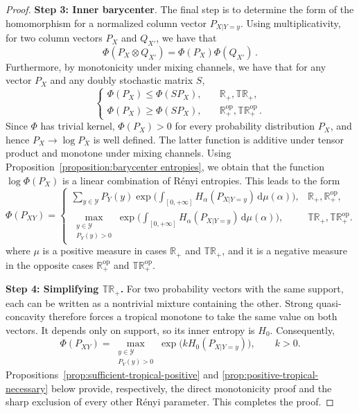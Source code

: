 \documentclass[aps,pra,11pt,onecolumn,nofootinbib,tightenlines]{revtex4-2}
\theoremstyle{definition}
\begin{document}
\begin{proof}
\noindent \textbf{Step 3: Inner barycenter}. The final step is to determine the form of the homomorphism for a normalized column vector $P_{X|Y=y}$. Using multiplicativity, for two column vectors $P_X$ and $Q_{X'}$, we have that
\begin{equation}
    \Phi(P_X \otimes Q_{X'}) = \Phi(P_X) \Phi(Q_{X'}) \,.
\end{equation}
Furthermore, by monotonicity under mixing channels, we have that for any vector $P_X$ and any doubly stochastic matrix $S$,
\begin{equation}
\begin{cases}
 \Phi(P_X)\leq \Phi(SP_X), & \quad \mathbb{R}_+,\mathbb{TR}_+, \\
\Phi(P_X) \geq \Phi(SP_X), & \quad \mathbb{R}_+^{\mathrm{op}},\mathbb{TR}_+^{\mathrm{op}}\,.
\end{cases}
\end{equation}
Since $\Phi$ has trivial kernel, $\Phi(P_X)>0$ for every probability distribution $P_X$, and hence $P_X\to \log{P_X}$ is well defined.
The latter function is additive under tensor product and monotone under mixing channels. Using Proposition~\ref{proposition:barycenter entropies}, we obtain that the function $\log{\Phi(P_X)}$ is a linear combination of Rényi entropies. This leads to the form
\begin{equation}
\label{eq:FinalForm proof}
\Phi(P_{XY}) =
\begin{cases}
\displaystyle \sum_{y \in \mathcal{Y}} P_Y(y) \exp\Bigg(\int_{[0,+\infty]} H_\alpha(P_{X|Y=y}) \, \mathrm{d}\mu(\alpha) \Bigg), & \mathbb{R}_+,\mathbb{R}_+^{\mathrm{op}}, \\
\displaystyle \max \limits_{\substack{y \in \mathcal{Y} \\ P_Y( y) > 0}} \exp\Bigg(\int_{[0,+\infty]} H_\alpha(P_{X|Y=y}) \, \mathrm{d}\mu(\alpha) \Bigg), & \mathbb{TR}_+,\mathbb{TR}_+^{\mathrm{op}}.
\end{cases}
\end{equation}
where $\mu$ is a positive measure in cases $\mathbb{R}_+$ and $\mathbb{TR}_+$, and it is a negative measure in the opposite cases $\mathbb{R}^{\mathrm{op}}_+$ and $\mathbb{TR}^{\mathrm{op}}_+$.

\bigskip
\bigskip

\noindent \textbf{Step 4: Simplifying $\mathbb{TR}_+$.}
For two probability vectors with the same support, each can be written as a
nontrivial mixture containing the other. Strong quasi-concavity therefore
forces a tropical monotone to take the same value on both vectors. It depends
only on support, so its inner entropy is $H_0$. Consequently,
\begin{equation}
    \Phi(P_{XY}) = \max \limits_{\substack{y \in \mathcal{Y} \\ P_Y( y) > 0}}
    \exp\!\bigl(kH_0(P_{X|Y=y})\bigr), \qquad k>0.
\end{equation}
Propositions~\ref{prop:sufficient-tropical-positive} and
\ref{prop:positive-tropical-necessary} below provide, respectively, the
direct monotonicity proof and the sharp exclusion of every other Rényi
parameter. This completes the proof.
\end{proof}
\end{document}
